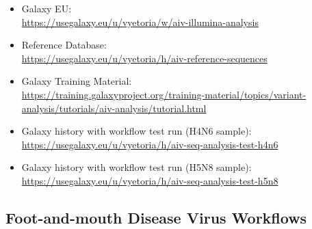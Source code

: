 \begin{itemize}
	\setlength{\itemsep}{-0.4cm}
	\item Galaxy EU:\\
	\url{https://usegalaxy.eu/u/vyetoria/w/aiv-illumina-analysis}
	\item Reference Database:\\
	\url{https://usegalaxy.eu/u/vyetoria/h/aiv-reference-sequences}
	\item Galaxy Training Material:\\
	\url{https://training.galaxyproject.org/training-material/topics/variant-analysis/tutorials/aiv-analysis/tutorial.html}
	\item Galaxy history with workflow test run (H4N6 sample):\\
	\url{https://usegalaxy.eu/u/vyetoria/h/aiv-seq-analysis-test-h4n6}
	\item Galaxy history with workflow test run (H5N8 sample):\\
	\url{https://usegalaxy.eu/u/vyetoria/h/aiv-seq-analysis-test-h5n8}
\end{itemize}

\subsection*{\thesubsection \quad Foot-and-mouth Disease Virus Workflows}
\label{sec:apx-fmdv-links}

